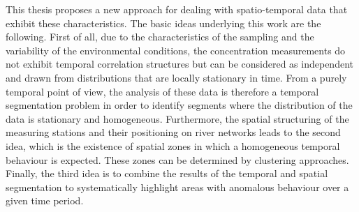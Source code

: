This thesis proposes a new approach for dealing with spatio-temporal data that exhibit these characteristics.  The basic ideas underlying this work are the following. First of all, due to the characteristics of the sampling and the variability of the environmental conditions, the concentration measurements do not exhibit temporal correlation structures but can be considered as independent and drawn from distributions that are locally stationary in time. From a purely temporal point of view, the analysis of these data is therefore a temporal segmentation problem in order to identify segments where the distribution of the data is stationary and homogeneous. Furthermore, the spatial structuring of the measuring stations and their positioning on river networks leads to the second idea, which is the existence of spatial zones in which a homogeneous temporal behaviour is expected. These zones can be determined by clustering approaches. Finally, the third idea is to combine the results of the temporal and spatial segmentation to systematically highlight areas with anomalous behaviour over a given time period.





